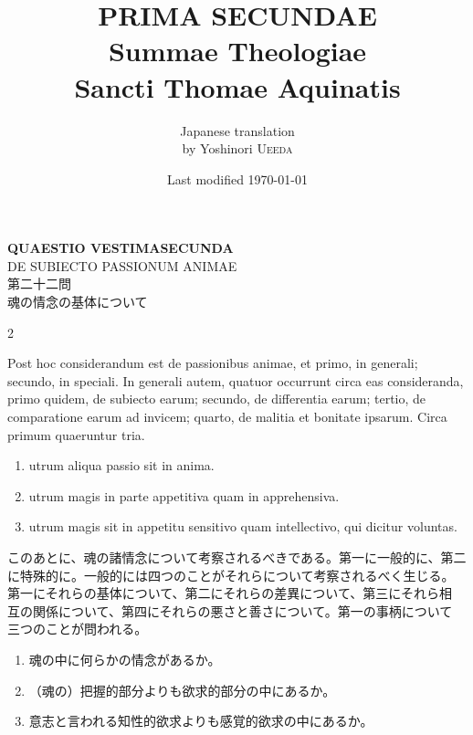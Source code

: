 \documentclass[paper=a4paper,fontsize=10pt,jafontsize=9pt,titlepage]{jlreq}
\title{{\bfseries PRIMA SECUNDAE}\\{\Huge Summae Theologiae}\\Sancti Thomae
Aquinatis}
\author{Japanese translation\\by Yoshinori {\scshape Ueeda}}
\date{Last modified \today}
\begin{document}
\maketitle
\pagestyle{fancy}


\begin{center}
 {\Large {\bfseries QUAESTIO VESTIMASECUNDA}}\\
 {\large DE SUBIECTO PASSIONUM ANIMAE}\\

 {\Large 第二十二問\\魂の情念の基体について}
\end{center}

\begin{paracol}{2}

Post hoc considerandum est de passionibus animae, et primo, in generali;
 secundo, in speciali. In generali autem, quatuor occurrunt circa eas
 consideranda, primo quidem, de subiecto earum; secundo, de differentia
 earum; tertio, de comparatione earum ad invicem; quarto, de malitia et
 bonitate ipsarum. Circa primum quaeruntur tria. 


\begin{enumerate}
 \item utrum aliqua passio sit in anima.
 \item utrum magis in parte appetitiva quam in apprehensiva.
 \item utrum magis sit in appetitu sensitivo quam intellectivo, qui dicitur voluntas.
\end{enumerate}

\switchcolumn

このあとに、魂の諸情念について考察されるべきである。第一に一般的に、第二
 に特殊的に。一般的には四つのことがそれらについて考察されるべく生じる。
 第一にそれらの基体について、第二にそれらの差異について、第三にそれら相
 互の関係について、第四にそれらの悪さと善さについて。第一の事柄について
 三つのことが問われる。


 \begin{enumerate}
  \item 魂の中に何らかの情念があるか。
  \item （魂の）把握的部分よりも欲求的部分の中にあるか。
  \item 意志と言われる知性的欲求よりも感覚的欲求の中にあるか。
 \end{enumerate}

\end{paracol}
\end{document}

